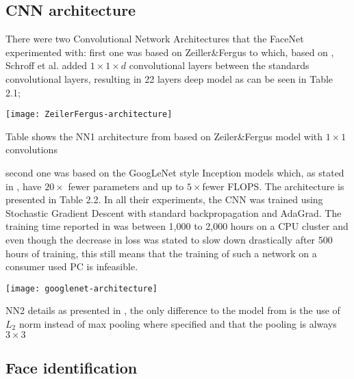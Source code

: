 \subsection{CNN architecture}
There were two Convolutional Network Architectures that the FaceNet experimented with: first one was based on Zeiller\&Fergus \cite{ZeilerF13} to which, based on \cite{LinCY13}, Schroff et al. added $1 \times 1 \times d$ convolutional layers between the standards convolutional layers, resulting in 22 layers deep model as can be seen in Table 2.1;
\begin{table}[h]
	\begin{center}
		\texttt{[image: ZeilerFergus-architecture]}
	\end{center}
	\caption[Zeiler\&Fergus architecture used in FaceNet]{Table shows the NN1 architecture from \cite{SchroffKP15} based on Zeiler\&Fergus model with $1 \times 1$ convolutions}
\end{table}
 second one was based on the GoogLeNet style Inception models \cite{DSzegedyLJSRAEVR14} which, as stated in \cite{SchroffKP15}, have $20\times$ fewer parameters and up to $5\times$fewer FLOPS. The architecture is presented in Table 2.2. In all their experiments, the CNN was trained using Stochastic Gradient Descent with standard backpropagation and AdaGrad. The training time reported in \cite{SchroffKP15} was between 1,000 to 2,000 hours on a CPU cluster and even though the decrease in loss was stated to slow down drastically after 500 hours of training, this still means that the training of such a network on a consumer used PC is infeasible. 
 \begin{table}[h]
 	\begin{center}
 		\texttt{[image: googlenet-architecture]}
 	\end{center}
 	\caption[NN2 Inception CNN architecture]{NN2 details as presented in \cite{SchroffKP15}, the only difference to the model from \cite{DSzegedyLJSRAEVR14} is the use of $L_2$ norm instead of max pooling where specified and that the pooling is always $3\times3$}
 \end{table}
\subsection{Face identification} \label{face_recognition}

